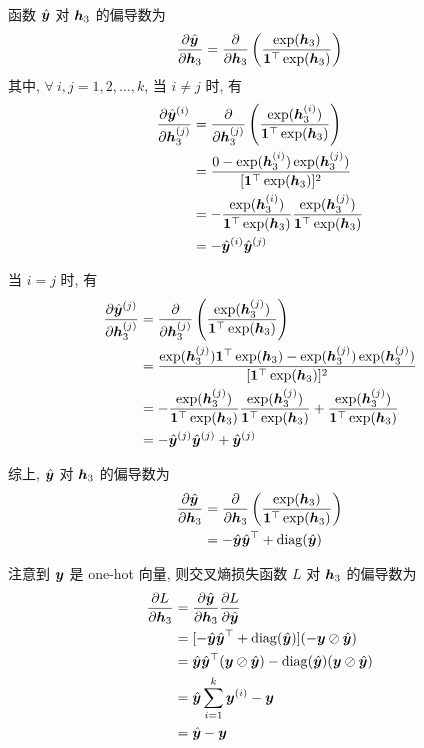 \documentclass{article}
\begin{document}
函数 $\hat{\bm{y}}$ 对 $\bm{h}_3$ 的偏导数为
\begin{equation}
  \frac{\partial \hat{\bm{y}}}{\partial\bm{h}_3}
  =\frac{\partial}{\partial\bm{h}_3}\left(\frac{\exp(\bm{h}_3)}{\bm{1}^\top\exp(\bm{h}_3)}\right)
\end{equation}
其中, $\forall~i,j=1,2,\dots,k$, 当 $i\neq j$ 时, 有
\begin{equation}
  \begin{aligned}
    \frac{\partial \hat{\bm{y}}^{(i)}}{\partial\bm{h}_3^{(j)}}
    &=\frac{\partial}{\partial\bm{h}_3^{(j)}}\left(\frac{\exp(\bm{h}_3^{(i)})}{\bm{1}^\top\exp(\bm{h}_3)}\right)\\
    &=\frac{0-\exp(\bm{h}_3^{(i)})\exp(\bm{h}_3^{(j)})}{[\bm{1}^\top\exp(\bm{h}_3)]^2}\\
    &=-\frac{\exp(\bm{h}_3^{(i)})}{\bm{1}^\top\exp(\bm{h}_3)}\frac{\exp(\bm{h}_3^{(j)})}{\bm{1}^\top\exp(\bm{h}_3)}\\
    &=-\hat{\bm{y}}^{(i)}\hat{\bm{y}}^{(j)}
  \end{aligned}
\end{equation}

当 $i=j$ 时, 有
\begin{equation}
  \begin{aligned}
    \frac{\partial \hat{\bm{y}}^{(j)}}{\partial\bm{h}_3^{(j)}}
    &=\frac{\partial}{\partial\bm{h}_3^{(j)}}\left(\frac{\exp(\bm{h}_3^{(j)})}{\bm{1}^\top\exp(\bm{h}_3)}\right)\\
    &=\frac{\exp(\bm{h}_3^{(j)})\bm{1}^\top\exp(\bm{h}_3)-\exp(\bm{h}_3^{(j)})\exp(\bm{h}_3^{(j)})}{[\bm{1}^\top\exp(\bm{h}_3)]^2}\\
    &=-\frac{\exp(\bm{h}_3^{(j)})}{\bm{1}^\top\exp(\bm{h}_3)}\frac{\exp(\bm{h}_3^{(j)})}{\bm{1}^\top\exp(\bm{h}_3)}+\frac{\exp(\bm{h}_3^{(j)})}{\bm{1}^\top\exp(\bm{h}_3)}\\
    &=-\hat{\bm{y}}^{(j)}\hat{\bm{y}}^{(j)}+\hat{\bm{y}}^{(j)}
  \end{aligned}
\end{equation}

综上, $\hat{\bm{y}}$ 对 $\bm{h}_3$ 的偏导数为
\begin{equation}
  \begin{aligned}
    \frac{\partial \hat{\bm{y}}}{\partial\bm{h}_3}
    &=\frac{\partial}{\partial\bm{h}_3}\left(\frac{\exp(\bm{h}_3)}{\bm{1}^\top\exp(\bm{h}_3)}\right)\\
    &=-\hat{\bm{y}}\hat{\bm{y}}^\top+\operatorname{diag}(\hat{\bm{y}})\\
  \end{aligned}
\end{equation}

注意到 $\bm{y}$ 是 one-hot 向量, 则交叉熵损失函数 $L$ 对 $\bm{h}_3$ 的偏导数为
\begin{equation}
  \begin{aligned}
    \frac{\partial L}{\partial \bm{h}_3}
    &=\frac{\partial \hat{\bm{y}}}{\partial\bm{h}_3}\frac{\partial L}{\partial \hat{\bm{y}}}\\
    &=[-\hat{\bm{y}}\hat{\bm{y}}^\top+\operatorname{diag}(\hat{\bm{y}})](-\bm{y}\oslash\hat{\bm{y}})\\
    &=\hat{\bm{y}}\hat{\bm{y}}^\top(\bm{y}\oslash\hat{\bm{y}})-\operatorname{diag}(\hat{\bm{y}})(\bm{y}\oslash\hat{\bm{y}})\\
    &=\hat{\bm{y}}\sum_{i=1}^k\bm{y}^{(i)}-\bm{y}\\
    &=\hat{\bm{y}}-\bm{y}\\
  \end{aligned}
\end{equation}
\end{document}
